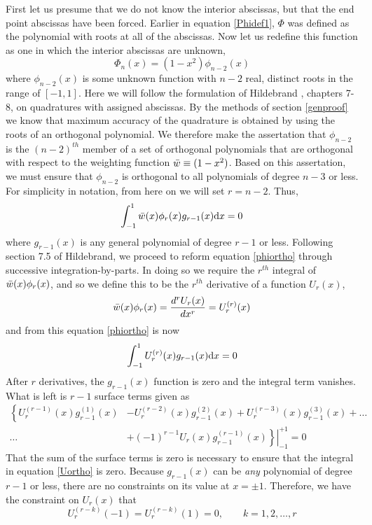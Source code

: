 First let us presume that we do not know the interior abscissas, but that the
end point abscissas have been forced. Earlier in equation \ref{Phidef1}, $\Phi$
was defined as the polynomial with roots at all of the abscissas. Now let us 
redefine this function as one in which the interior abscissas are unknown, 
\begin{equation}
\label{Phiudef}
\Phi_n(x)=(1-x^2)\phi_{n-2}(x)
\end{equation}
where $\phi_{n-2}(x)$ is some unknown function with $n-2$ real, distinct roots
in the range of $[-1,1]$. Here we will follow the formulation of Hildebrand 
\cite{Hildebrand}, chapters 7-8, on quadratures with assigned abscissas. 
By the methods of section \ref{genproof} we know that maximum accuracy of the 
quadrature is obtained by using the roots of an orthogonal polynomial. We 
therefore make the assertation that $\phi_{n-2}$ is the $(n-2)^{th}$ member of
a set of orthogonal polynomials that are orthogonal with respect to the 
weighting function $\bar{w} \equiv (1-x^2)$. Based on this assertation, we must
ensure that $\phi_{n-2}$ is orthogonal to all polynomials of degree $n-3$ or less. 
For simplicity in notation, from here on we will set $r=n-2$. 
Thus, 
\begin{equation}
\label{phiortho}
\int_{-1}^{1} \bar{w}(x)\phi_r(x)g_{r-1}(x){\rm d}x=0
\end{equation}
where $g_{r-1}(x)$ is any general polynomial of degree $r-1$ or less. 
Following section 7.5 of Hildebrand\cite{Hildebrand}, we proceed to reform
equation \ref{phiortho} through successive integration-by-parts. In doing
so we require the $r^{th}$ integral of $\bar{w}(x)\phi_r(x)$, and so we define
this to be the $r^{th}$ derivative of a function $U_r(x)$, 
\begin{equation}
\label{Udef}
\bar{w}(x)\phi_r(x)=\frac{d^rU_r(x)}{dx^r} = U^{(r)}_r(x)
\end{equation}
and from this equation \ref{phiortho} is now
\begin{equation}
\label{Uortho}
\int_{-1}^{1} U^{(r)}_r(x)g_{r-1}(x){\rm d}x = 0
\end{equation}
After $r$ derivatives, the $g_{r-1}(x)$ function is zero and the integral term
vanishes. What is left is $r-1$ surface terms given as
\begin{align}
\label{Usurface}
\left\{ U_r^{(r-1)}(x)g_{r-1}^{(1)}(x)\right. &- U_r^{(r-2)}(x)g_{r-1}^{(2)}(x) + U_r^{(r-3)}(x)g_{r-1}^{(3)}(x) + \dots \nonumber \\
 \dots &+ \left. \left. (-1)^{r-1}U_r(x)g_{r-1}^{(r-1)}(x)\right\} \right|_{-1}^{+1}  = 0
\end{align}
That the sum of the surface terms is zero is necessary to ensure that the integral
in equation \ref{Uortho} is  zero. Because $g_{r-1}(x)$ can be {\it any} 
polynomial of degree $r-1$ or less, there are no constraints on its value at 
$x=\pm1$. Therefore, we have the constraint on $U_r(x)$ that 
\begin{equation}
\label{Uend}
U_r^{(r-k)}(-1)=U_r^{(r-k)}(1)=0, \quad\quad k=1,2,\dots,r
\end{equation}

